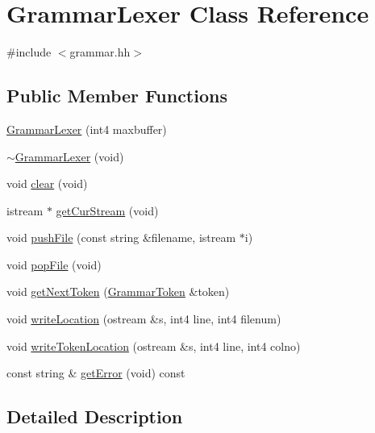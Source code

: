 \hypertarget{class_grammar_lexer}{}\section{Grammar\+Lexer Class Reference}
\label{class_grammar_lexer}


{\ttfamily \#include $<$grammar.\+hh$>$}

\subsection*{Public Member Functions}
\begin{DoxyCompactItemize}
\item 
\mbox{\hyperlink{class_grammar_lexer_a9232da982dd036a4faea857e56a11bdf}{Grammar\+Lexer}} (int4 maxbuffer)
\item 
\mbox{\hyperlink{class_grammar_lexer_a9201b664f6f62710050d71e110f354b7}{$\sim$\+Grammar\+Lexer}} (void)
\item 
void \mbox{\hyperlink{class_grammar_lexer_a504d1049d783129cbcf0200eec46c48b}{clear}} (void)
\item 
istream $\ast$ \mbox{\hyperlink{class_grammar_lexer_a002169896b7e1d463f3b561cce59de8f}{get\+Cur\+Stream}} (void)
\item 
void \mbox{\hyperlink{class_grammar_lexer_a053c4258141f4244299fe8b5a1687b98}{push\+File}} (const string \&filename, istream $\ast$i)
\item 
void \mbox{\hyperlink{class_grammar_lexer_a12173551f5c48ec06c6b8ae786a645ed}{pop\+File}} (void)
\item 
void \mbox{\hyperlink{class_grammar_lexer_a789e031dad20e99c2c8a548fac69013d}{get\+Next\+Token}} (\mbox{\hyperlink{class_grammar_token}{Grammar\+Token}} \&token)
\item 
void \mbox{\hyperlink{class_grammar_lexer_ade29e19b65738586df731f7c3acb4af0}{write\+Location}} (ostream \&s, int4 line, int4 filenum)
\item 
void \mbox{\hyperlink{class_grammar_lexer_a8fe74274d20023e61b3c7dd81b3c4f8c}{write\+Token\+Location}} (ostream \&s, int4 line, int4 colno)
\item 
const string \& \mbox{\hyperlink{class_grammar_lexer_adf4a367811f6445ec9b06aeadcd34e55}{get\+Error}} (void) const
\end{DoxyCompactItemize}


\subsection{Detailed Description}


